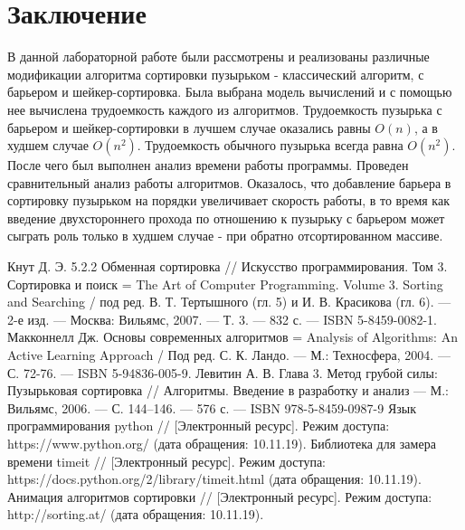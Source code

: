 \documentclass[a4paper, 14pt]{article}
\begin{document}
        \section*{Заключение}
        В данной лабораторной работе были рассмотрены и реализованы различные модификации алгоритма сортировки пузырьком - классический алгоритм, с барьером и шейкер-сортировка. Была выбрана модель вычислений и с помощью нее вычислена трудоемкость каждого из алгоритмов. Трудоемкость пузырька с барьером и шейкер-сортировки в лучшем случае оказались равны $O(n)$, а в худшем случае $O(n^2)$. Трудоемкость обычного пузырька всегда равна $O(n^2)$. После чего был выполнен анализ времени работы программы. Проведен сравнительный анализ работы алгоритмов. Оказалось, что добавление барьера в сортировку пузырьком на порядки увеличивает скорость работы, в то время как введение двухстороннего прохода по отношению к пузырьку с барьером может сыграть роль только в худшем случае - при обратно отсортированном массиве.


    \begin{center}
    	\newpage
\newpage
{}

\begin{thebibliography}{11} 
    Кнут Д. Э. 5.2.2 Обменная сортировка // Искусство программирования. Том 3. Сортировка и поиск = The Art of Computer Programming. Volume 3. Sorting and Searching / под ред. В. Т. Тертышного (гл. 5) и И. В. Красикова (гл. 6). — 2-е изд. — Москва: Вильямс, 2007. — Т. 3. — 832 с. — ISBN 5-8459-0082-1.
      Макконнелл Дж. Основы современных алгоритмов = Analysis of Algorithms: An Active Learning Approach / Под ред. С. К. Ландо. — М.: Техносфера, 2004. — С. 72-76. — ISBN 5-94836-005-9.
      Левитин А. В. Глава 3. Метод грубой силы: Пузырьковая сортировка // Алгоритмы. Введение в разработку и анализ — М.: Вильямс, 2006. — С. 144–146. — 576 с. — ISBN 978-5-8459-0987-9
      Язык программирования python // [Электронный ресурс]. Режим
доступа: https://www.python.org/ (дата обращения: 10.11.19).
	 Библиотека для замера времени timeit // [Электронный ресурс]. Режим
доступа: https://docs.python.org/2/library/timeit.html (дата обращения: 10.11.19).
	 Анимация алгоритмов сортировки // [Электронный ресурс]. Режим
доступа: http://sorting.at/ (дата обращения: 10.11.19).
	
        
    \end{thebibliography}
	\newpage
	
	
    \end{center}        
\end{document}

